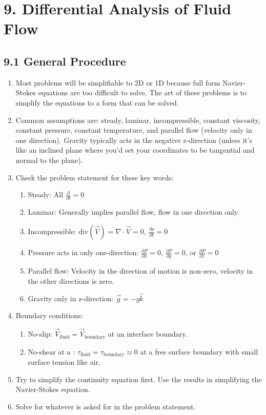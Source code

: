 \section*{9. Differential Analysis of Fluid Flow}
\subsection*{9.1 General Procedure}
\begin{enumerate}
    \item Most problems will be simplifiable to 2D or 1D because full form Navier-Stokes equations are too difficult to solve. The art of these 
    problems is to simplify the equations to a form that can be solved.
    \item Common assumptions are: steady, laminar, incompressible, constant viscosity, constant pressure, constant temperature, and
    parallel flow (velocity only in one direction). Gravity typically acts in the negative z-direction (unless it's like an inclined 
    plane where you'd set your coordinates to be tangential and normal to the plane).
    \item Check the problem statement for these key words: %
    \begin{enumerate}[label=\roman*)]
        \item Steady: All $\frac{\partial}{\partial t} = 0$
        \item Laminar: Generally implies parallel flow, flow in one direction only.
        \item Incompressible: $\text{div}(\vec{V}) = \nabla \cdot \vec{V} = 0$, $\frac{\partial \rho}{\partial t} = 0$
        \item Pressure acts in only one-direction: $\frac{\partial P}{\partial x} = 0$, $\frac{\partial P}{\partial y} = 0$, or $\frac{\partial P}{\partial z} = 0$ 
        \item Parallel flow: Velocity in the direction of motion is non-zero, velocity in the other directions is zero.
        \item Gravity only in z-direction: $\vec{g} = -g \hat{k}$
    \end{enumerate}
    \item Boundary conditions:
    \begin{enumerate}[label=\roman*)]
        \item No-slip: $\vec{V}_{\text{fluid}} = \vec{V}_{\text{boundary}}$ at an interface boundary.
        \item No-shear at a : $\tau_{\text{fluid}} = \tau_{\text{boundary}} \approx 0$ at a free surface boundary with small surface tension like air.
    \end{enumerate}
    \item Try to simplify the continuity equation first. Use the results in simplifying the Navier-Stokes equation.
    \item Solve for whatever is asked for in the problem statement.
\end{enumerate}


